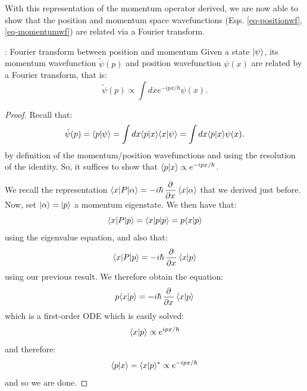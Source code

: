 With this representation of the momentum operator derived, we are now able to show that the position and momentum space wavefunctions (Eqs. \eqref{eq-positionwf}, \eqref{eq-momentumwf}) are related via a Fourier transform.

\begin{propbox}{: Fourier transform between position and momentum}
    Given a state $\lvert \psi \rangle$, its momentum wavefunction $\tilde{\psi}(p)$ and position wavefunction $\psi(x)$ are related by a Fourier transform, that is:
    \begin{equation}
        \tilde{\psi}(p) \propto \int dx e^{-ipx/\hbar}\psi(x).
    \end{equation}
\end{propbox}

\begin{proof}
    Recall that:
    \begin{equation}
        \tilde{\psi}(p) = \langle p \lvert \psi \rangle = \int dx \langle p \lvert x \rangle\langle x \lvert \psi \rangle = \int dx \langle p \lvert x \rangle \psi(x).
    \end{equation}
    by definition of the momentum/position wavefunctions and using the resolution of the identity. So, it suffices to show that $\langle p \lvert x \rangle \propto e^{-ipx/\hbar}$.
    
    We recall the representation $\bra{x}P\ket{\alpha} = -i\hbar\dpd{}{x}\braket{x}{\alpha}$ that we derived just before. Now, set $\lvert \alpha \rangle = \lvert p \rangle$ a momentum eigenstate. We then have that:
    \begin{equation}
        \langle x \rvert P\lvert p \rangle = \langle x \rvert p\lvert p \rangle = p\langle x \lvert p \rangle
    \end{equation}
    using the eigenvalue equation, and also that:
    \begin{equation}
        \bra{x}P\ket{p} = -i\hbar\dpd{}{x}\braket{x}{p}
    \end{equation}
    using our previous result. We therefore obtain the equation:
    \begin{equation}
        p\braket{x}{p} = -i\hbar\dpd{}{x}\braket{x}{p}
    \end{equation}
    which is a first-order ODE which is easily solved:
    \begin{equation}
        \langle x \lvert p \rangle \propto e^{ipx/\hbar}
    \end{equation}
    and therefore:
    \begin{equation}
        \langle p \lvert x \rangle = \langle x \lvert p \rangle^* \propto e^{-ipx/\hbar}
    \end{equation}
    and so we are done.
\end{proof}

